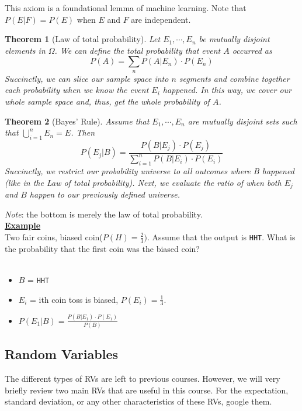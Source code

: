 \documentclass[12pt]{article}
\newcommand{\skln}{\\[\baselineskip]}
\newcommand{\aside}[1]{\noindent\textbf{\underline{#1}}\skln}
\newtheorem{theorem}{Theorem}[section]
\begin{document}
This axiom is a foundational lemma of machine learning.  Note that $P(E | F) = P(E)$ when $E$ and $F$ are independent.

\begin{theorem}[Law of total probability]
Let $E_1, \cdots, E_n$ be mutually disjoint elements in $\Omega$. We can define the total probability that event $A$ occurred as \[P(A) = \sum \limits_{n} P(A | E_n) \cdot P(E_n)\]Succinctly, we can slice our sample space into $n$ segments and combine together each probability when we know the event $E_i$ happened. In this way, we cover our whole sample space and, thus, get the whole probability of $A$.
\end{theorem}

\begin{theorem}[Bayes' Rule]

Assume that $E_1, \cdots, E_n$ are mutually disjoint sets such that $\bigcup \limits_{i=1}^{n} E_n = E$. Then \[P(E_j | B) = \frac{P(B | E_j) \cdot P(E_j)}{\sum \limits_{i=1}^{n} P(B | E_i) \cdot P(E_i)}\]Succinctly, we restrict our probability universe to all outcomes where B happened (like in the Law of total probability). Next, we evaluate the ratio of when both $E_j$ and $B$ happen to our previously defined universe.
\end{theorem}

\textit{Note}: the bottom is merely the law of total probability. \skln
\aside{Example}
Two fair coins, biased coin($P(H) = \frac{2}{3})$.  Assume that the output is \texttt{HHT}. What is the probability that the first coin was the biased coin?
\\ \\
\begin{itemize}
\item $B$ = \texttt{HHT}
\item $E_i$ = ith coin toss is biased, $P(E_i) = \frac{1}{3}$.
\item $P(E_1 | B) = \frac{P(B | E_1) \cdot P(E_1)}{P(B)}$
\end{itemize}

\subsection{Random Variables}

The different types of RVs are left to previous courses. However, we will very briefly review two main RVs that are useful in this course. For the expectation, standard deviation, or any other characteristics of these RVs, google them.
\end{document}
